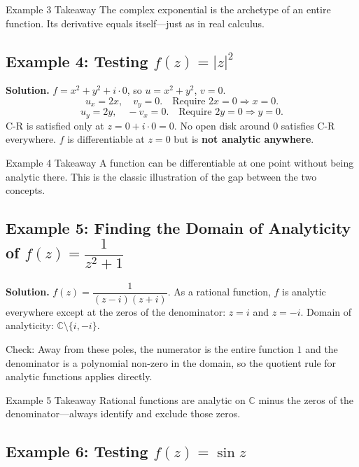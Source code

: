 \documentclass[12pt,a4paper]{article}
\begin{document}
\begin{learnbox}{Example 3 Takeaway}
The complex exponential is the archetype of an entire function. Its derivative equals itself---just as in real calculus.
\end{learnbox}

\subsection*{Example 4: Testing $f(z) = |z|^{2}$}

\textbf{Solution.}  $f = x^{2}+y^{2}+i\cdot 0$, so $u = x^{2}+y^{2}$, $v = 0$.
\[
  u_x = 2x, \quad v_y = 0. \quad \text{Require } 2x = 0 \Rightarrow x = 0.
\]
\[
  u_y = 2y, \quad -v_x = 0. \quad \text{Require } 2y = 0 \Rightarrow y = 0.
\]
C-R is satisfied only at $z = 0 + i\cdot 0 = 0$.
No open disk around $0$ satisfies C-R everywhere.
$f$ is differentiable at $z=0$ but is \textbf{not analytic anywhere}.

\begin{learnbox}{Example 4 Takeaway}
A function can be differentiable at one point without being analytic there. This is the classic illustration of the gap between the two concepts.
\end{learnbox}

\subsection*{Example 5: Finding the Domain of Analyticity of $f(z) = \dfrac{1}{z^{2}+1}$}

\textbf{Solution.}  $f(z) = \dfrac{1}{(z-i)(z+i)}$.
As a rational function, $f$ is analytic everywhere except at the zeros of the
denominator: $z = i$ and $z = -i$.
Domain of analyticity: $\mathbb{C}\setminus\{i, -i\}$.

Check: Away from these poles, the numerator is the entire function $1$ and the
denominator is a polynomial non-zero in the domain, so the quotient rule for
analytic functions applies directly.

\begin{learnbox}{Example 5 Takeaway}
Rational functions are analytic on $\mathbb{C}$ minus the zeros of the denominator---always identify and exclude those zeros.
\end{learnbox}

\subsection*{Example 6: Testing $f(z) = \sin z$}
\end{document}
